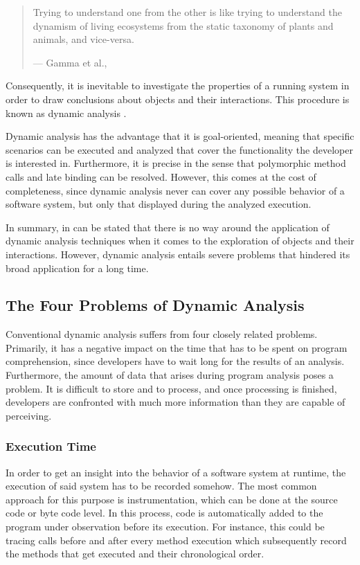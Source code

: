 \begin{quote}
Trying to understand one from the other is like trying to understand the dynamism of living ecosystems from the static taxonomy of plants and animals, and vice-versa.
\par\raggedleft--- \textup{Gamma et al.}, \cite{gamma_design_1995}
\end{quote}

Consequently, it is inevitable to investigate the properties of a running system in order to draw conclusions about objects and their interactions.
This procedure is known as dynamic analysis \cite{bell_concept_1999}.

Dynamic analysis has the advantage that it is goal-oriented, meaning that specific scenarios can be executed and analyzed that cover the functionality the developer is interested in.
Furthermore, it is precise in the sense that polymorphic method calls and late binding can be resolved.
However, this comes at the cost of completeness, since dynamic analysis never can cover any possible behavior of a software system, but only that displayed during the analyzed execution.

In summary, in can be stated that there is no way around the application of dynamic analysis techniques when it comes to the exploration of objects and their interactions.
However, dynamic analysis entails severe problems that hindered its broad application for a long time.

\subsection{The Four Problems of Dynamic Analysis}
\label{ss:BackgroundAnalysisProblems}
Conventional dynamic analysis suffers from four closely related problems.
Primarily, it has a negative impact on the time that has to be spent on program comprehension, since developers have to wait long for the results of an analysis.
Furthermore, the amount of data that arises during program analysis poses a problem. 
It is difficult to store and to process, and once processing is finished, developers are confronted with much more information than they are capable of perceiving.

\subsubsection{Execution Time}
In order to get an insight into the behavior of a software system at runtime, the execution of said system has to be recorded somehow.
The most common approach for this purpose is instrumentation, which can be done at the source code or byte code level.
In this process, code is automatically added to the program under observation before its execution.
For instance, this could be tracing calls before and after every method execution which subsequently record the methods that get executed and their chronological order.

